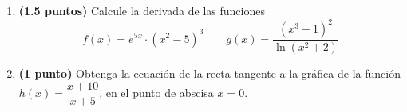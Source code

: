 
\begin{enumerate}[label=\alph*)]
\item \textbf{(1.5 puntos)} Calcule la derivada de las funciones
\[
f(x)=e^{5x}\cdot(x^2-5)^3\qquad g(x)=\dfrac{(x^3+1)^2}{\ln(x^2+2)}
\]
\item \textbf{(1 punto)} Obtenga la ecuación de la recta tangente a la gráfica de la función $h(x)=\dfrac{x+10}{x+5}$, en el punto de abscisa $x=0$.
\end{enumerate}
